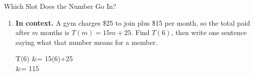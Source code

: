 \documentclass[10pt]{article}
\begin{document}
\begin{notesbox}{Which Slot Does the Number Go In?}
\begin{enumerate}[leftmargin=1.6em, itemsep=4pt, topsep=4pt]
\\

\item \textbf{In context.} A gym charges \$25 to join plus \$15 per month, so the total paid after
$m$ months is $T(m)=15m+25$. Find $T(6)$, then write one sentence saying what that number means
for a member.
\begin{work}
  T(6) &= 15(6)+25 \\
       &= 115
\end{work}

\end{enumerate}
\end{notesbox}
\end{document}
